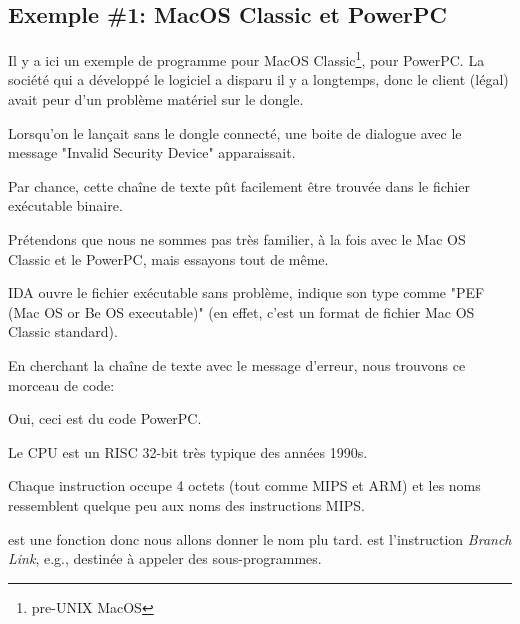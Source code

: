 \newcommand{\PPC}{\InSqBrackets{\emph{PowerPC(tm) Microprocessor Family: The Programming Environments for 32-Bit Microprocessors}, (2000)}\footnote{\AlsoAvailableAs \url{http://yurichev.com/mirrors/PowerPC/6xx_pem.pdf}}}

\newcommand{\PPCABI}{[Steve Zucker, SunSoft and Kari Karhi, IBM, \emph{SYSTEM V APPLICATION BINARY INTERFACE: PowerPC Processor Supplement}, (1995)]\footnote{\AlsoAvailableAs \url{http://yurichev.com/mirrors/PowerPC/elfspec_ppc.pdf}}}

\subsection{Exemple \#1: MacOS Classic et PowerPC}

Il y a ici un exemple de programme pour MacOS Classic\footnote{pre-UNIX MacOS}, pour PowerPC.
La société qui a développé le logiciel a disparu il y a longtemps, donc le client
(légal) avait peur d'un problème matériel sur le dongle.

Lorsqu'on le lançait sans le dongle connecté, une boite de dialogue avec le message
"Invalid Security Device" apparaissait.

Par chance, cette chaîne de texte pût facilement être trouvée dans le fichier exécutable binaire.

Prétendons que nous ne sommes pas très familier, à la fois avec le Mac OS Classic et le PowerPC, mais essayons tout de même.

\ac{IDA} 
ouvre le fichier exécutable sans problème, indique son type comme
"PEF (Mac OS or Be OS executable)" (en effet, c'est un format de fichier Mac OS Classic
standard).

En cherchant la chaîne de texte avec le message d'erreur, nous trouvons ce morceau
de code:



Oui, ceci est du code PowerPC.

Le CPU est un \ac{RISC} 32-bit très typique des années 1990s.

Chaque instruction occupe 4 octets (tout comme MIPS et ARM) et les noms ressemblent
quelque peu aux noms des instructions MIPS.

 est une fonction donc nous allons donner le nom plu tard.
 est l'instruction \emph{Branch Link}, e.g., destinée à appeler des sous-programmes.

